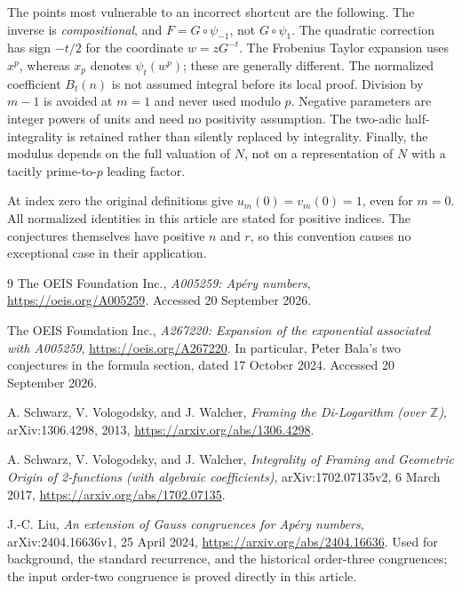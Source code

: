 \documentclass[11pt,letterpaper]{article}
\numberwithin{equation}{section}
\theoremstyle{definition}
\theoremstyle{remark}
\newcommand{\Z}{\mathbb Z}
\begin{document}
The points most vulnerable to an incorrect shortcut are the following.
The inverse is \emph{compositional}, and $F=G\circ\psi_{-1}$, not
$G\circ\psi_1$. The quadratic correction has sign $-t/2$ for the coordinate
$w=zG^{-t}$. The Frobenius Taylor expansion uses $x^p$, whereas $x_p$
denotes $\psi_t(w^p)$; these are generally different. The normalized
coefficient $B_t(n)$ is not assumed integral before its local proof.
Division by $m-1$ is avoided at $m=1$ and never used modulo $p$.
Negative parameters are integer powers of units and need no positivity
assumption. The two-adic half-integrality is retained rather than silently
replaced by integrality. Finally, the modulus depends on the full
valuation of $N$, not on a representation of $N$ with a tacitly
prime-to-$p$ leading factor.

At index zero the original definitions give $u_m(0)=v_m(0)=1$, even for
$m=0$. All normalized identities in this article are stated for positive
indices. The conjectures themselves have positive $n$ and $r$, so this
convention causes no exceptional case in their application.

\begin{thebibliography}{9}
The OEIS Foundation Inc.,
\emph{A005259: Ap\'ery numbers},
\url{https://oeis.org/A005259}.
Accessed 20 September 2026.

The OEIS Foundation Inc.,
\emph{A267220: Expansion of the exponential associated with A005259},
\url{https://oeis.org/A267220}.
In particular, Peter Bala's two conjectures in the formula section,
dated 17 October 2024. Accessed 20 September 2026.

A. Schwarz, V. Vologodsky, and J. Walcher,
\emph{Framing the Di-Logarithm (over $\Z$)},
arXiv:1306.4298, 2013,
\url{https://arxiv.org/abs/1306.4298}.

A. Schwarz, V. Vologodsky, and J. Walcher,
\emph{Integrality of Framing and Geometric Origin of 2-functions
(with algebraic coefficients)},
arXiv:1702.07135v2, 6 March 2017,
\url{https://arxiv.org/abs/1702.07135}.

J.-C. Liu,
\emph{An extension of Gauss congruences for Ap\'ery numbers},
arXiv:2404.16636v1, 25 April 2024,
\url{https://arxiv.org/abs/2404.16636}.
Used for background, the standard recurrence, and the historical
order-three congruences; the input order-two congruence is proved directly
in this article.
\end{thebibliography}
\end{document}
